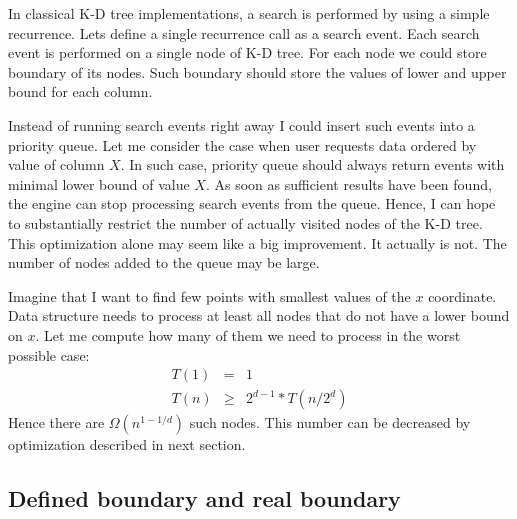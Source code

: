 \documentclass[10pt,a4paper]{article}
\begin{document}
In classical K-D tree implementations, a search is performed by using a simple recurrence. Lets define a single recurrence call as a search event. Each search event is performed on a single node of K-D tree. For each node we could store boundary of its nodes. Such boundary should store the values of lower and upper bound for each column.

Instead of running search events right away I could insert such events into a priority queue. Let me consider the case when user requests data ordered by value of column $X$. In such case, priority queue should always return events with minimal lower bound of value $X$. As soon as sufficient results have been found, the engine can stop processing search events from the queue. Hence, I can hope to substantially restrict the number of actually visited nodes of the K-D tree. This optimization alone may seem like a big improvement. It actually is not. The number of nodes added to the queue may be large.

Imagine that I want to find few points with smallest values of the $x$ coordinate. Data structure needs to process at least all nodes
that do not have a lower bound on $x$. Let me compute how many of them we need to process in the worst possible case:
\begin{eqnarray*}
T(1) &=& 1\\
T(n) &\geq& 2^{d-1} * T(n/2^{d})
\end{eqnarray*}
Hence there are $\Omega (n^{1-1/d})$ such nodes. This number can be decreased by optimization described in next section.

\subsection{Defined boundary and real boundary}
\end{document}
